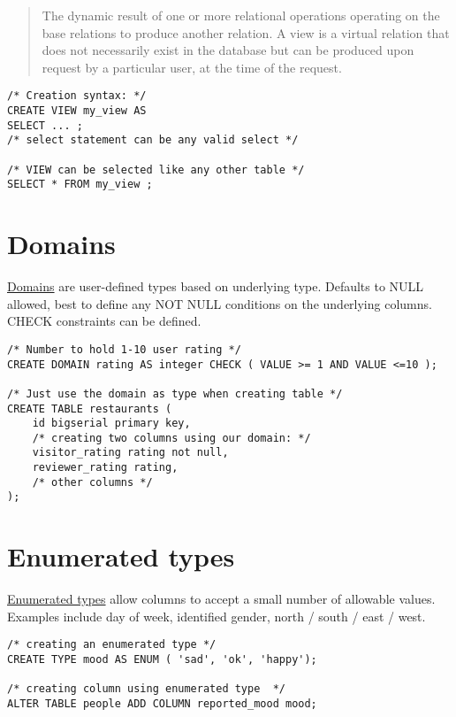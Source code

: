 \begin{quote}
The dynamic result of one or more relational operations operating on the
base relations to produce another relation. A view is a virtual relation
that does not necessarily exist in the database but can be produced upon
request by a particular user, at the time of the request.
\end{quote}

\begin{verbatim}
/* Creation syntax: */
CREATE VIEW my_view AS
SELECT ... ;
/* select statement can be any valid select */

/* VIEW can be selected like any other table */
SELECT * FROM my_view ; 
\end{verbatim}

\section{Domains}\label{sec:domains}

\href{https://www.postgresql.org/docs/13/domains.html}{Domains} are
user-defined types based on underlying type. Defaults to NULL allowed,
best to define any NOT NULL conditions on the underlying columns. CHECK
constraints can be defined.

\begin{verbatim}
/* Number to hold 1-10 user rating */
CREATE DOMAIN rating AS integer CHECK ( VALUE >= 1 AND VALUE <=10 );

/* Just use the domain as type when creating table */
CREATE TABLE restaurants (
    id bigserial primary key,
    /* creating two columns using our domain: */
    visitor_rating rating not null,
    reviewer_rating rating, 
    /* other columns */
);
\end{verbatim}

\section{Enumerated types}\label{sec:enumerated-types}

\href{https://www.postgresql.org/docs/13/datatype-enum.html}{Enumerated
types} allow columns to accept a small number of allowable values.
Examples include day of week, identified gender, north / south / east /
west.

\begin{verbatim}
/* creating an enumerated type */
CREATE TYPE mood AS ENUM ( 'sad', 'ok', 'happy');

/* creating column using enumerated type  */
ALTER TABLE people ADD COLUMN reported_mood mood;
\end{verbatim}



